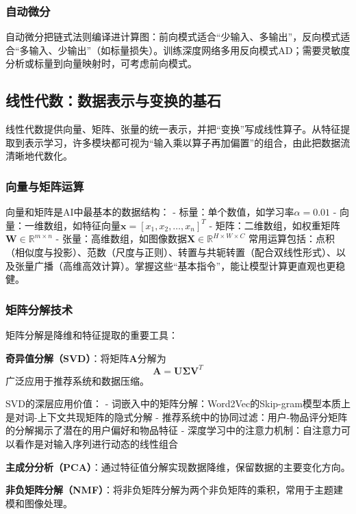 \subsubsection{自动微分}

自动微分把链式法则编译进计算图：前向模式适合“少输入、多输出”，反向模式适合“多输入、少输出”（如标量损失）。训练深度网络多用反向模式AD；需要灵敏度分析或标量到向量映射时，可考虑前向模式。

\subsection{线性代数：数据表示与变换的基石}

线性代数提供向量、矩阵、张量的统一表示，并把“变换”写成线性算子。从特征提取到表示学习，许多模块都可视为“输入乘以算子再加偏置”的组合，由此把数据流清晰地代数化。

\subsubsection{向量与矩阵运算}
向量和矩阵是AI中最基本的数据结构：
- 标量：单个数值，如学习率$\alpha = 0.01$
- 向量：一维数组，如特征向量$\mathbf{x} = [x_1, x_2, \ldots, x_n]^T$
- 矩阵：二维数组，如权重矩阵$\mathbf{W} \in \mathbb{R}^{m \times n}$
- 张量：高维数组，如图像数据$\mathbf{X} \in \mathbb{R}^{H \times W \times C}$
常用运算包括：点积（相似度与投影）、范数（尺度与正则）、转置与共轭转置（配合双线性形式）、以及张量广播（高维高效计算）。掌握这些“基本指令”，能让模型计算更直观也更稳健。

\subsubsection{矩阵分解技术}
矩阵分解是降维和特征提取的重要工具：

\textbf{奇异值分解（SVD）}：将矩阵$\mathbf{A}$分解为
$$\mathbf{A} = \mathbf{U}\mathbf{\Sigma}\mathbf{V}^T$$
广泛应用于推荐系统和数据压缩。

SVD的深层应用价值：
- 词嵌入中的矩阵分解：Word2Vec的Skip-gram模型本质上是对词-上下文共现矩阵的隐式分解
- 推荐系统中的协同过滤：用户-物品评分矩阵的分解揭示了潜在的用户偏好和物品特征
- 深度学习中的注意力机制：自注意力可以看作是对输入序列进行动态的线性组合

\textbf{主成分分析（PCA）}：通过特征值分解实现数据降维，保留数据的主要变化方向。

\textbf{非负矩阵分解（NMF）}：将非负矩阵分解为两个非负矩阵的乘积，常用于主题建模和图像处理。

